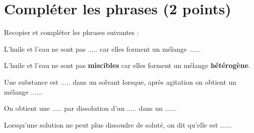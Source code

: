 \section{Compléter les phrases (2 points)}

Recopier et compléter les phrases suivantes :
\begin{questions}
	\question L'huile et l'eau ne sont pas $.....$ car elles forment un mélange $.....$.
	\begin{solution}
		L'huile et l'eau ne sont pas \textbf{miscibles} car elles forment un mélange \textbf{hétérogène}.
	\end{solution}
	
	\question Une substance est $.....$ dans un solvant lorsque, après agitation on obtient un mélange $.....$.
	
	
	\question On obtient une $.....$ par dissolution d'un $.....$ dans un $.....$.
	
	\question Lorsqu'une solution ne peut plus dissoudre de soluté, on dit qu'elle est $.....$.
\end{questions}